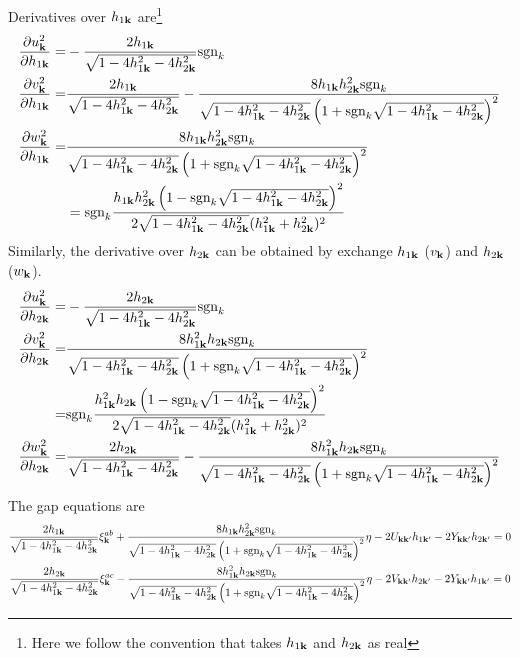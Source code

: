 Derivatives over $h_{1\mathbf{k}}$ are\footnote{Here we follow the convention that takes $h_{1\mathbf{k}}$ and $h_{2\mathbf{k}}$ as real}
\begin{equation}
\begin{split}
\frac{\partial{u_{\ensuremath{\mathbf{k}}}^2}}{\partial{h_{1\ensuremath{\mathbf{k}}}}}=&-\frac{2 h_{1\mathbf{k}}}{\sqrt{1-4 h_{1\mathbf{k}}^2-4 h_{2\mathbf{k}}^2}}\text{sgn}_{k}\\
\frac{\partial{v_{\ensuremath{\mathbf{k}}}^2}}{\partial{h_{1\ensuremath{\mathbf{k}}}}}=&\frac{2 h_{1\mathbf{k}}}{\sqrt{1-4 h_{1\mathbf{k}}^2-4 h_{2\mathbf{k}}^2}}-\frac{8 h_{1\mathbf{k}} h_{2\mathbf{k}}^2\text{sgn}_{k}}{\sqrt{1-4 h_{1\mathbf{k}}^2-4 h_{2\mathbf{k}}^2} \left(1+\text{sgn}_{k}\sqrt{1-4 h_{1\mathbf{k}}^2-4 h_{2\mathbf{k}}^2}\right)^2}\\
\frac{\partial{w_{\ensuremath{\mathbf{k}}}^2}}{\partial{h_{1\ensuremath{\mathbf{k}}}}}=&\frac{8 h_{1\mathbf{k}} h_{2\mathbf{k}}^2\text{sgn}_{k}}{\sqrt{1-4 h_{1\mathbf{k}}^2-4 h_{2\mathbf{k}}^2} \left(1+\text{sgn}_{k}\sqrt{1-4 h_{1\mathbf{k}}^2-4 h_{2\mathbf{k}}^2}\right)^2}\\
&=\text{sgn}_{k}\frac{h_{1\mathbf{k}} h_{2\mathbf{k}}^2 \left(1-\text{sgn}_{k}\sqrt{1-4 h_{1\mathbf{k}}^2-4 h_{2\mathbf{k}}^2}\right)^2}{2\sqrt{1-4 h_{1\mathbf{k}}^2-4 h_{2\mathbf{k}}^2} (h_{1\mathbf{k}}^2 + h_{2\mathbf{k}}^2)^2}
\end{split}
\end{equation}
Similarly, the derivative over $h_{2\mathbf{k}}$ can be obtained by exchange $h_{1\mathbf{k}}$ ($v_{\mathbf{k}}$) and $h_{2\mathbf{k}}$ ($w_{\mathbf{k}}$).
\begin{equation}
\begin{split}
\frac{\partial{u_{\ensuremath{\mathbf{k}}}^2}}{\partial{h_{2\ensuremath{\mathbf{k}}}}}=&-\frac{2 h_{2\mathbf{k}}}{\sqrt{1-4 h_{1\mathbf{k}}^2-4 h_{2\mathbf{k}}^2}}\text{sgn}_{k}\\
\frac{\partial{v_{\ensuremath{\mathbf{k}}}^2}}{\partial{h_{2\ensuremath{\mathbf{k}}}}}=&\frac{8 h_{1\mathbf{k}} ^{2}h_{2\mathbf{k}}\text{sgn}_{k}}{\sqrt{1-4 h_{1\mathbf{k}}^2-4 h_{2\mathbf{k}}^2} \left(1+\text{sgn}_{k}\sqrt{1-4 h_{1\mathbf{k}}^2-4 h_{2\mathbf{k}}^2}\right)^2}\\
=&\text{sgn}_{k}\frac{h_{1\mathbf{k}}^{2}h_{2\mathbf{k}} \left(1-\text{sgn}_{k}\sqrt{1-4 h_{1\mathbf{k}}^2-4 h_{2\mathbf{k}}^2}\right)^2}{2\sqrt{1-4 h_{1\mathbf{k}}^2-4 h_{2\mathbf{k}}^2} (h_{1\mathbf{k}}^2 + h_{2\mathbf{k}}^2)^2}\\
\frac{\partial{w_{\ensuremath{\mathbf{k}}}^2}}{\partial{h_{2\ensuremath{\mathbf{k}}}}}=&\frac{2 h_{2\mathbf{k}}}{\sqrt{1-4 h_{1\mathbf{k}}^2-4 h_{2\mathbf{k}}^2}}-\frac{8 h_{1\mathbf{k}} ^{2}h_{2\mathbf{k}}\text{sgn}_{k}}{\sqrt{1-4 h_{1\mathbf{k}}^2-4 h_{2\mathbf{k}}^2} \left(1+\text{sgn}_{k}\sqrt{1-4 h_{1\mathbf{k}}^2-4 h_{2\mathbf{k}}^2}\right)^2}
\end{split}
\end{equation}
The gap equations are 
\begin{subequations}\label{eq:20100909:fullgap}
\begin{gather}
\frac{2h_{1\mathbf{k}}}{\sqrt{1-4 h_{1\mathbf{k}}^2-4 h_{2\mathbf{k}}^2}} \xi^{ab}_{\mathbf{k}}+\frac{8 h_{1\mathbf{k}} h_{2\mathbf{k}}^2\text{sgn}_{k}}{\sqrt{1-4 h_{1\mathbf{k}}^2-4 h_{2\mathbf{k}}^2} \left(1+\text{sgn}_{k}\sqrt{1-4 h_{1\mathbf{k}}^2-4 h_{2\mathbf{k}}^2}\right)^2}\eta-2U_{\mathbf{k}\mathbf{k}'}h_{1\mathbf{k}'}-2Y_{\mathbf{k}\mathbf{k}'}h_{2\mathbf{k}'}=0
\label{eq:20100909:fullgapa}\\
\frac{2h_{2\mathbf{k}}}{\sqrt{1-4 h_{1\mathbf{k}}^2-4 h_{2\mathbf{k}}^2}} \xi^{ac}_{\mathbf{k}}-\frac{8 h_{1\mathbf{k}}^{2} h_{2\mathbf{k}}\text{sgn}_{k}}{\sqrt{1-4 h_{1\mathbf{k}}^2-4 h_{2\mathbf{k}}^2} \left(1+\text{sgn}_{k}\sqrt{1-4 h_{1\mathbf{k}}^2-4 h_{2\mathbf{k}}^2}\right)^2}\eta-2V_{\mathbf{k}\mathbf{k}'}h_{2\mathbf{k}'}-2Y_{\mathbf{k}\mathbf{k}'}h_{1\mathbf{k}'}=0
\label{eq:20100909:fullgapb}
\end{gather}
\end{subequations}

